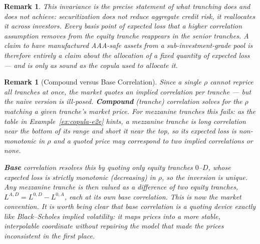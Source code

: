 \documentclass{report}
\theoremstyle{spacedplain}
\theoremstyle{spaceddefinition}
\theoremstyle{spacedremark}
\newtheorem{remark}[theorem]{Remark}
\begin{document}
\begin{remark}
This invariance is the precise statement of what tranching does and does not achieve: securitization does not reduce aggregate credit risk, it reallocates it across investors. Every basis point of expected loss that a higher correlation assumption removes from the equity tranche reappears in the senior tranches. A claim to have manufactured AAA-safe assets from a sub-investment-grade pool is therefore entirely a claim about the \emph{allocation} of a fixed quantity of expected loss --- and is only as sound as the copula used to allocate it.
\end{remark}
\begin{remark}[Compound versus Base Correlation]
Since a single $\rho$ cannot reprice all tranches at once, the market quotes an implied correlation per tranche --- but the naive version is ill-posed. \textbf{Compound} (tranche) correlation solves for the $\rho$ matching a given tranche's market price. For mezzanine tranches this fails: as the table in Example~\ref{ex:copula-e2e} hints, a mezzanine tranche is long correlation near the bottom of its range and short it near the top, so its expected loss is \emph{non-monotonic} in $\rho$ and a quoted price may correspond to two implied correlations or none.

\textbf{Base} correlation resolves this by quoting only \emph{equity} tranches $0$--$D$, whose expected loss is strictly monotonic (decreasing) in $\rho$, so the inversion is unique. Any mezzanine tranche is then valued as a difference of two equity tranches, $L^{A,D} = L^{0,D} - L^{0,A}$, each at its own base correlation. This is now the market convention. It is worth being clear that base correlation is a \emph{quoting device} exactly like Black--Scholes implied volatility: it maps prices into a more stable, interpolable coordinate without repairing the model that made the prices inconsistent in the first place.
\end{remark}
\end{document}
